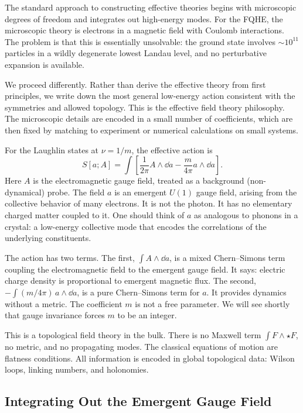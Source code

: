The standard approach to constructing effective theories begins with microscopic degrees of freedom and integrates out high-energy modes. For the FQHE, the microscopic theory is electrons in a magnetic field with Coulomb interactions. The problem is that this is essentially unsolvable: the ground state involves $\sim 10^{11}$ particles in a wildly degenerate lowest Landau level, and no perturbative expansion is available.

We proceed differently. Rather than derive the effective theory from first principles, we write down the most general low-energy action consistent with the symmetries and allowed topology. This is the effective field theory philosophy. The microscopic details are encoded in a small number of coefficients, which are then fixed by matching to experiment or numerical calculations on small systems.

For the Laughlin states at $\nu=1/m$, the effective action is
\begin{equation}
  S[a;A]
  =
  \int\left[
  \frac{1}{2\pi}A\wedge\dd a
  -
  \frac{m}{4\pi}a\wedge\dd a
  \right].
  \label{eq:fqhe-action}
\end{equation}
Here $A$ is the electromagnetic gauge field, treated as a background (non-dynamical) probe. The field $a$ is an emergent $U(1)$ gauge field, arising from the collective behavior of many electrons. It is not the photon. It has no elementary charged matter coupled to it. One should think of $a$ as analogous to phonons in a crystal: a low-energy collective mode that encodes the correlations of the underlying constituents.

The action has two terms. The first, $\int A\wedge\dd a$, is a mixed Chern--Simons term coupling the electromagnetic field to the emergent gauge field. It says: electric charge density is proportional to emergent magnetic flux. The second, $-\int (m/4\pi)\,a\wedge\dd a$, is a pure Chern--Simons term for $a$. It provides dynamics without a metric. The coefficient $m$ is not a free parameter. We will see shortly that gauge invariance forces $m$ to be an integer.

This is a topological field theory in the bulk. There is no Maxwell term $\int F\wedge\star F$, no metric, and no propagating modes. The classical equations of motion are flatness conditions. All information is encoded in global topological data: Wilson loops, linking numbers, and holonomies.

\subsection{Integrating Out the Emergent Gauge Field}
\label{subsec:fqhe-integrate-out}


